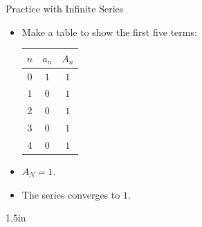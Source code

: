 \begin{exercise}{Practice with Infinite Series \Coffeecup \Coffeecup \Coffeecup}
\begin{itemize}
{\begin{itemize}
        \item Make a table to show the first five terms:
        \begin{center}
        \begin{tabular}{|c|c|c|} \hline
            $n$ & $a_n$ & $A_n$ \\
            \hline
            0 & $1$ & $1$ \\
            1 & $0$ & $1$ \\
            2 & $0$ & $1$ \\
            3 & $0$ & $1$ \\
            4 & $0$ & $1$ \\
            \hline
        \end{tabular}
        \end{center}

    \item $A_N=1$.

    \item The series converges to $1$.
    \end{itemize}
}{1.5in}
\end{itemize}
\end{exercise}
